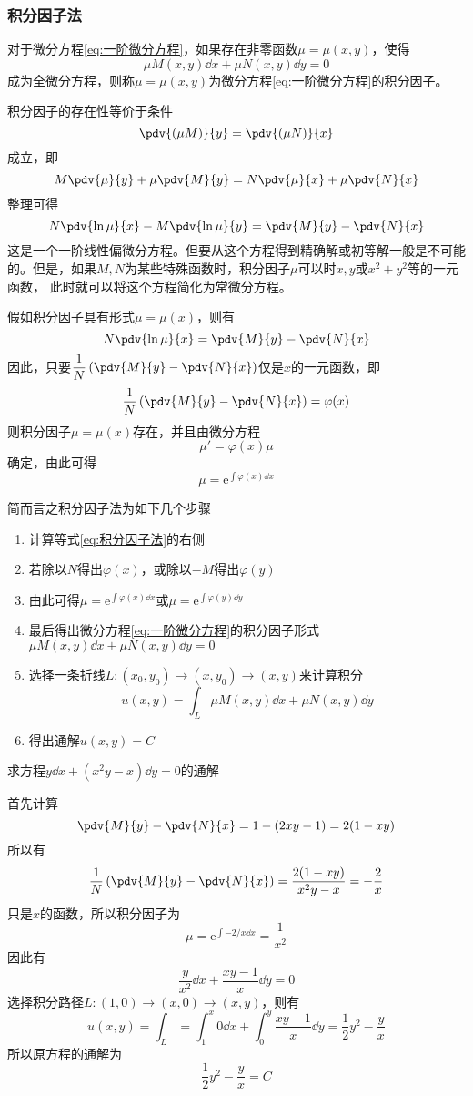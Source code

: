 \subsubsection{积分因子法}
对于微分方程\ref{eq:一阶微分方程}，如果存在非零函数$\mu=\mu(x,y)$，使得
\[ \mu M(x,y)\dd{x} + \mu N(x,y)\dd{y} = 0 \]
成为全微分方程，则称$\mu=\mu(x,y)$为微分方程\ref{eq:一阶微分方程}的积分因子。

积分因子的存在性等价于条件
\[ \pdv{(\mu M)}{y} = \pdv{(\mu N)}{x} \]
成立，即
\[ M\pdv{\mu}{y} + \mu\pdv{M}{y} = N\pdv{\mu}{x} + \mu\pdv{N}{x} \]
整理可得
\begin{equation}
    \label{eq:积分因子法}
    N\pdv{\ln\mu}{x} - M\pdv{\ln\mu}{y} = \pdv{M}{y} - \pdv{N}{x}
\end{equation}
这是一个一阶线性偏微分方程。但要从这个方程得到精确解或初等解一般是不可能的。但是，如果$M,N$为某些特殊函数时，积分因子$\mu$可以时$x,y$或$x^2+y^2$等的一元函数，
此时就可以将这个方程简化为常微分方程。

假如积分因子具有形式$\mu=\mu(x)$，则有
\[ N\pdv{\ln\mu}{x} = \pdv{M}{y} - \pdv{N}{x} \]
因此，只要$\displaystyle \frac{1}{N}\left(\pdv{M}{y}-\pdv{N}{x}\right)$仅是$x$的一元函数，即
\[ \frac{1}{N}\left(\pdv{M}{y}-\pdv{N}{x}\right) = \varphi(x) \]
则积分因子$\mu=\mu(x)$存在，并且由微分方程
\[ \mu'=\varphi(x)\mu \]
确定，由此可得
\[ \mu = \mathrm{e}^{\int \varphi(x)\dd{x}} \]

简而言之积分因子法为如下几个步骤
\begin{enumerate}
    \item 计算等式\ref{eq:积分因子法}的右侧
    \item 若除以$N$得出$\varphi(x)$，或除以$-M$得出$\varphi(y)$
    \item 由此可得$\mu = \mathrm{e}^{\int \varphi(x) \dd{x}}$或$\mu = \mathrm{e}^{\int \varphi(y) \dd{y}}$
    \item 最后得出微分方程\ref{eq:一阶微分方程}的积分因子形式$\mu M(x,y)\dd{x} + \mu N(x,y)\dd{y} = 0$
    \item 选择一条折线$L:(x_0,y_0)\to(x,y_0)\to(x,y)$来计算积分\[u(x,y) = \int_L \mu M(x,y)\dd{x} + \mu N(x,y)\dd{y}\]
    \item 得出通解$u(x,y)=C$
\end{enumerate}
\begin{example}
    求方程$y\dd{x}+(x^2y-x)\dd{y}=0$的通解
\end{example}
\begin{solution}
    首先计算
    \[ \pdv{M}{y}-\pdv{N}{x} = 1 - (2xy - 1) = 2(1-xy) \]
    所以有
    \[ \frac{1}{N}\left(\pdv{M}{y}-\pdv{N}{x}\right) = \frac{2(1-xy)}{x^2y-x} = -\frac{2}{x} \]
    只是$x$的函数，所以积分因子为
    \[ \mu = \mathrm{e}^{\int -2/x\dd{x}} = \frac{1}{x^2}  \]
    因此有
    \[ \frac{y}{x^2}\dd{x} + \frac{xy-1}{x}\dd{y} = 0 \]
    选择积分路径$L:(1,0)\to(x,0)\to(x,y)$，则有
    \[ u(x,y) = \int_L = \int_1^x 0 \dd{x} + \int_0^y \frac{xy-1}{x}\dd{y} = \frac{1}{2}y^2-\frac{y}{x}  \]
    所以原方程的通解为
    \[ \frac{1}{2}y^2-\frac{y}{x} = C \]
\end{solution}

